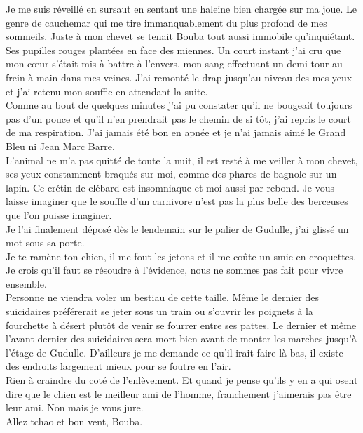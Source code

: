Je me suis réveillé en sursaut en sentant une haleine bien chargée sur ma joue. Le genre de cauchemar qui me tire immanquablement du plus profond de mes sommeils. Juste à mon chevet se tenait Bouba tout aussi immobile qu'inquiétant. Ses pupilles rouges plantées en face des miennes. Un court instant j'ai cru que mon cœur s'était mis à battre à l'envers, mon sang effectuant un demi tour au frein à main dans mes veines. J'ai remonté le drap jusqu'au niveau des mes yeux et j'ai retenu mon souffle en attendant la suite. \\
Comme au bout de quelques minutes j'ai pu constater qu'il ne bougeait toujours pas d'un pouce et qu'il n'en prendrait pas le chemin de si tôt, j'ai repris le court de ma respiration. J'ai jamais été bon en apnée et je n'ai jamais aimé le Grand Bleu ni Jean Marc Barre. \\

L'animal ne m'a pas quitté de toute la nuit, il est resté à me veiller à mon chevet, ses yeux constamment braqués sur moi, comme des phares de bagnole sur un lapin. Ce crétin de clébard est insomniaque et moi aussi par rebond. Je vous laisse imaginer que le souffle d'un carnivore n'est pas la plus belle des berceuses que l'on puisse imaginer. \\

Je l'ai finalement déposé dès le lendemain sur le palier de Gudulle, j'ai glissé un mot sous sa porte. \\
Je te ramène ton chien, il me fout les jetons et il me coûte un smic en croquettes. Je crois qu'il faut se résoudre à l'évidence, nous ne sommes pas fait pour vivre ensemble. \\

Personne ne viendra voler un bestiau de cette taille. Même le dernier des suicidaires préférerait se jeter sous un train ou s'ouvrir les poignets à la fourchette à désert plutôt de venir se fourrer entre ses pattes. Le dernier et même l'avant dernier des suicidaires sera mort bien avant de monter les marches jusqu'à l'étage de Gudulle. D'ailleurs je me demande ce qu'il irait faire là bas, il existe des endroits largement mieux pour se foutre en l'air.\\
Rien à craindre du coté de l'enlèvement. Et quand je pense qu'ils y en a qui osent dire que le chien est le meilleur ami de l'homme, franchement j'aimerais pas être leur ami. Non mais je vous jure. \\

Allez tchao et bon vent, Bouba.